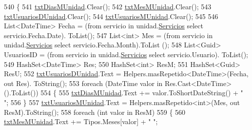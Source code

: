 \begin{DoxyCode}
540         \{
541             \hyperlink{class_proyecto___integrador__3_1_1_reportes_1_1_reporte_frecuencia_de_uso_ac57af5c45eb5829244bdb033e19a7ea8}{txtDiasMUnidad}.Clear();
542             \hyperlink{class_proyecto___integrador__3_1_1_reportes_1_1_reporte_frecuencia_de_uso_ae9d8312f5f3d8cef187f25210a97ad43}{txtMesMUnidad}.Clear();
543             \hyperlink{class_proyecto___integrador__3_1_1_reportes_1_1_reporte_frecuencia_de_uso_a0b2b2103ff7f1f55f8698b23e1672dbe}{txtUsuariosDUnidad}.Clear();
544             \hyperlink{class_proyecto___integrador__3_1_1_reportes_1_1_reporte_frecuencia_de_uso_a94304e1e8d7eae9ba6aad17385c65664}{txtUsuariosMUnidad}.Clear();
545 
546             List<DateTime> Fecha = (from servicio in unidad.\hyperlink{class_proyecto___integrador__3_1_1_tipos_dato_1_1_unidad_aca85e685e50da0af6be67e3ee69b1bb1}{Servicios} select servicio.Fecha.Date).
      ToList();
547             List<int> Mes = (from servicio in unidad.\hyperlink{class_proyecto___integrador__3_1_1_tipos_dato_1_1_unidad_aca85e685e50da0af6be67e3ee69b1bb1}{Servicios} select servicio.Fecha.Month).ToList
      ();
548             List<Guid> UsuariosID = (from servicio in unidad.\hyperlink{class_proyecto___integrador__3_1_1_tipos_dato_1_1_unidad_aca85e685e50da0af6be67e3ee69b1bb1}{Servicios} select servicio.Usuario).
      ToList();
549             HashSet<DateTime> Res;
550             HashSet<int> ResM;
551             HashSet<Guid> ResU;
552             \hyperlink{class_proyecto___integrador__3_1_1_reportes_1_1_reporte_frecuencia_de_uso_a0b2b2103ff7f1f55f8698b23e1672dbe}{txtUsuariosDUnidad}.Text = Helpers.masRepetido<DateTime>(Fecha, out Res).
      ToString();
553             \textcolor{keywordflow}{foreach} (DateTime valor \textcolor{keywordflow}{in} Res.Cast<DateTime>().ToList())
554             \{
555                 \hyperlink{class_proyecto___integrador__3_1_1_reportes_1_1_reporte_frecuencia_de_uso_ac57af5c45eb5829244bdb033e19a7ea8}{txtDiasMUnidad}.Text += valor.ToShortDateString() + \textcolor{stringliteral}{" "};
556             \}
557             \hyperlink{class_proyecto___integrador__3_1_1_reportes_1_1_reporte_frecuencia_de_uso_a94304e1e8d7eae9ba6aad17385c65664}{txtUsuariosMUnidad}.Text = Helpers.masRepetido<\textcolor{keywordtype}{int}>(Mes, out ResM).ToString();
558             \textcolor{keywordflow}{foreach} (\textcolor{keywordtype}{int} valor \textcolor{keywordflow}{in} ResM)
559             \{
560                 \hyperlink{class_proyecto___integrador__3_1_1_reportes_1_1_reporte_frecuencia_de_uso_ae9d8312f5f3d8cef187f25210a97ad43}{txtMesMUnidad}.Text += Tipos.Meses[valor] + \textcolor{stringliteral}{" "};

\end{DoxyCode}
